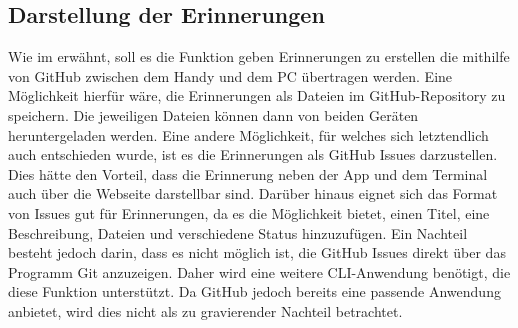 \subsection{Darstellung der Erinnerungen}\label{section:tech:sub:darstellung_der_erinnerungen}%
Wie im  erwähnt, soll es die Funktion geben Erinnerungen zu erstellen die mithilfe von GitHub zwischen dem Handy und dem PC übertragen werden.\newline%
Eine Möglichkeit hierfür wäre, die Erinnerungen als Dateien im GitHub-Repository zu speichern. Die jeweiligen Dateien können dann von beiden Geräten heruntergeladen werden.\newline%
Eine andere Möglichkeit, für welches sich letztendlich auch entschieden wurde, ist es die Erinnerungen als GitHub Issues darzustellen. Dies hätte den Vorteil, dass die Erinnerung neben der App und dem Terminal auch über die Webseite darstellbar sind. Darüber hinaus eignet sich das Format von Issues gut für Erinnerungen, da es die Möglichkeit bietet, einen Titel, eine Beschreibung, Dateien und verschiedene Status hinzuzufügen.\newline%
Ein Nachteil besteht jedoch darin, dass es nicht möglich ist, die GitHub Issues direkt über das Programm Git anzuzeigen. Daher wird eine weitere CLI-Anwendung benötigt, die diese Funktion unterstützt. Da GitHub jedoch bereits eine passende Anwendung anbietet\cite{tech_github-cli}, wird dies nicht als zu gravierender Nachteil betrachtet.
%
%
%